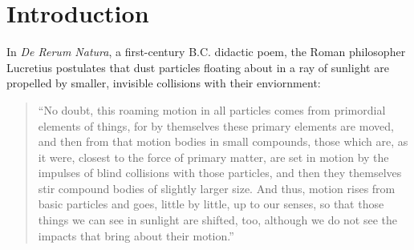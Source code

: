 \chapter{Introduction}
\label{ch1_intro}

In \emph{De Rerum Natura}, a first-century B.C. didactic poem, the Roman philosopher Lucretius postulates that dust particles floating about in a ray of sunlight are propelled by smaller, invisible collisions with their enviornment:
\begin{quote}
    ``No doubt, this roaming motion in all particles comes from primordial elements of things, for by themselves these primary elements are moved, and then from that motion bodies in small compounds, those which are, as it were, closest to the force of primary matter, are set in motion by the impulses of blind collisions with those particles, and then they themselves stir compound bodies of slightly larger size. And thus, motion rises from basic particles and goes, little by little, up to our senses, so that those things we can see in sunlight are shifted, too, although we do not see the impacts that bring about their motion.''~\cite{carus_nature_2010}
\end{quote} 
